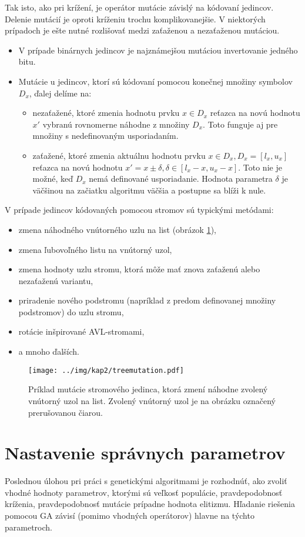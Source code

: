 Tak isto, ako pri krížení, je operátor mutácie závislý na kódovaní jedincov. Delenie mutácií je oproti kríženiu trochu komplikovanejšie. V niektorých prípadoch je ešte nutné rozlišovať medzi zaťaženou a nezaťaženou mutáciou. 
\begin{itemize}
\item V prípade binárnych jedincov je najznámejšou mutáciou invertovanie jedného bitu.
\item Mutácie u jedincov, ktorí sú kódovaní pomocou konečnej množiny symbolov $D_x$, ďalej delíme na:
\begin{itemize}
\item nezaťažené, ktoré zmenia hodnotu prvku $x \in D_x$ reťazca na novú hodnotu $x'$ vybranú rovnomerne náhodne z množiny $D_x$. Toto funguje aj pre množiny s nedefinovaným usporiadaním.
\item zaťažené, ktoré zmenia aktuálnu hodnotu prvku $x \in D_x, D_x = [l_x,u_x]$ reťazca na novú hodnotu $x' = x \pm \delta, \delta \in [l_x - x, u_x - x]$. Toto nie je možné, keď $D_x$ nemá definované usporiadanie. Hodnota parametra $\delta$ je väčšinou na začiatku algoritmu väčšia a postupne sa blíži k nule.
\end{itemize}
\end{itemize}
V prípade jedincov kódovaných pomocou stromov sú typickými metódami:
\begin{itemize}
\item zmena náhodného vnútorného uzlu na list (obrázok \ref{fig:TreeMutation}),
\item zmena ľubovoľného listu na vnútorný uzol,
\item zmena hodnoty uzlu stromu, ktorá môže mať znova zaťaženú alebo nezaťaženú variantu,
\item priradenie nového podstromu (napríklad z predom definovanej množiny podstromov) do uzlu stromu,
\item rotácie inšpirované AVL-stromami,
\item a mnoho ďalších.
\end{itemize}

\begin{figure}[h]
\centering
\centerline{\mbox{\texttt{[image: ../img/kap2/treemutation.pdf]}}}
\caption{Príklad mutácie stromového jedinca, ktorá zmení náhodne zvolený vnútorný uzol na list. Zvolený vnútorný uzol je na obrázku označený prerušovanou čiarou.}\label{fig:TreeMutation}
\end{figure}

\section{Nastavenie správnych parametrov}\label{kap2:2.6:Parameters}
Poslednou úlohou pri práci s genetickými algoritmami je rozhodnúť, ako zvoliť vhodné hodnoty parametrov, ktorými sú veľkosť populácie, pravdepodobnosť kríženia, pravdepodobnosť mutácie prípadne hodnota elitizmu. Hľadanie riešenia pomocou GA závisí (pomimo vhodných operátorov) hlavne na týchto parametroch.

